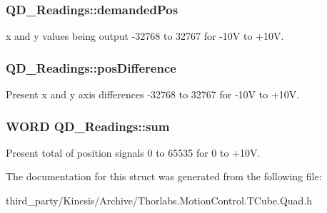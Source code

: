\subsubsection[{\texorpdfstring{demanded\+Pos}{demandedPos}}]{ Q\+D\+\_\+\+Readings\+::demanded\+Pos}\hypertarget{struct_q_d___readings_a6079ed031a93b1132466001608c6bd28}{}\label{struct_q_d___readings_a6079ed031a93b1132466001608c6bd28}


x and y values being output -\/32768 to 32767 for -\/10V to +10V. 

\subsubsection[{\texorpdfstring{pos\+Difference}{posDifference}}]{ Q\+D\+\_\+\+Readings\+::pos\+Difference}\hypertarget{struct_q_d___readings_a5c5a9ed7dc0c42a91975b01c3af69251}{}\label{struct_q_d___readings_a5c5a9ed7dc0c42a91975b01c3af69251}


Present x and y axis differences -\/32768 to 32767 for -\/10V to +10V. 

\subsubsection[{\texorpdfstring{sum}{sum}}]{\setlength{\rightskip}{0pt plus 5cm}W\+O\+RD Q\+D\+\_\+\+Readings\+::sum}\hypertarget{struct_q_d___readings_a34808338cc3bc115499929c70cf7081d}{}\label{struct_q_d___readings_a34808338cc3bc115499929c70cf7081d}


Present total of position signals 0 to 65535 for 0 to +10V. 



The documentation for this struct was generated from the following file\+:\begin{DoxyCompactItemize}
\item 
third\+\_\+party/\+Kinesis/\+Archive/Thorlabs.\+Motion\+Control.\+T\+Cube.\+Quad.\+h\end{DoxyCompactItemize}
